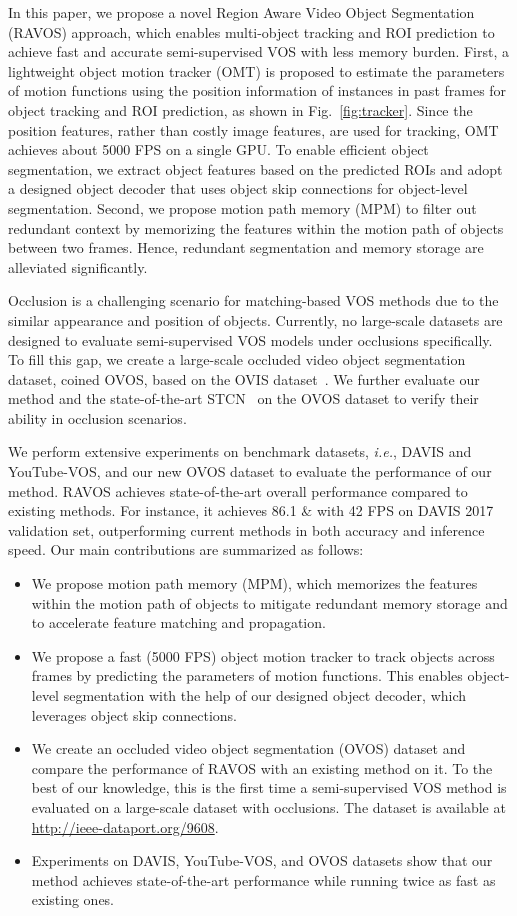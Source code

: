 \documentclass[journal]{IEEEtran}
\def\ie{\emph{i.e.}}
\begin{document}
In this paper, we propose a novel Region Aware Video Object Segmentation (RAVOS) approach, which enables multi-object tracking and ROI prediction to achieve fast and accurate semi-supervised VOS with less memory burden. First, a lightweight object motion tracker (OMT) is proposed to estimate the parameters of motion functions using the position information of instances in past frames for object tracking and ROI prediction, as shown in Fig.~\ref{fig:tracker}. Since the position features, rather than costly image features, are used for tracking, OMT achieves about 5000 FPS on a single GPU. To enable efficient object segmentation, we extract object features based on the predicted ROIs and adopt a designed object decoder that uses object skip connections for object-level segmentation. Second, we propose motion path memory (MPM) to filter out redundant context by memorizing the features within the motion path of objects between two frames. Hence, redundant segmentation and memory storage are alleviated significantly. 

Occlusion is a challenging scenario for matching-based VOS methods due to the similar appearance and position of objects. Currently, no large-scale datasets are designed to evaluate semi-supervised VOS models under occlusions specifically. To fill this gap, we create a large-scale occluded video object segmentation dataset, coined OVOS, based on the OVIS dataset~\cite{OVIS}. We further evaluate our method and the state-of-the-art STCN~\cite{STCN} on the OVOS dataset to verify their ability in occlusion scenarios.

We perform extensive experiments on benchmark datasets, \ie, DAVIS and YouTube-VOS, and our new OVOS dataset to evaluate the performance of our method. RAVOS achieves state-of-the-art overall performance compared to existing methods. For instance, it achieves 86.1 \& with 42 FPS on DAVIS 2017 validation set, outperforming current methods in both accuracy and inference speed. Our main contributions are summarized as follows:
\begin{itemize}
\item[] We propose motion path memory (MPM), which memorizes the features within the motion path of objects to mitigate redundant memory storage and to accelerate feature matching and propagation.
\item[] We propose a fast (5000 FPS) object motion tracker to track objects across frames by predicting the parameters of motion functions. This enables object-level segmentation with the help of our designed object decoder, which leverages object skip connections.
\item[] We create an occluded video object segmentation (OVOS) dataset and compare the performance of RAVOS with an existing method on it. To the best of our knowledge, this is the first time a semi-supervised VOS method is evaluated on a large-scale dataset with occlusions. The dataset is available at \url{http://ieee-dataport.org/9608}.
\item[]
Experiments on DAVIS, YouTube-VOS, and OVOS datasets show that our method achieves state-of-the-art performance while running twice as fast as existing ones.
\end{itemize} 
\end{document}
